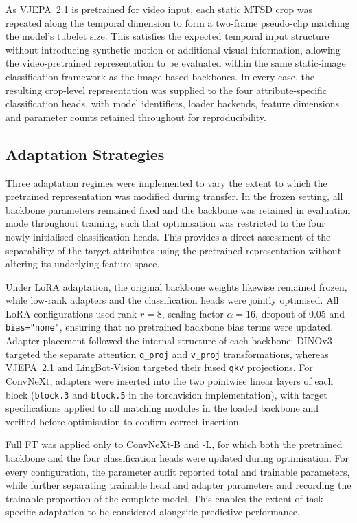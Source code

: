 As \gls{VJEPA}~2.1 is pretrained for video input, each static \gls{MTSD} crop was repeated along the temporal dimension to form a two-frame pseudo-clip matching the model's tubelet size. This satisfies the expected temporal input structure without introducing synthetic motion or additional visual information, allowing the video-pretrained representation to be evaluated within the same static-image classification framework as the image-based backbones. In every case, the resulting crop-level representation was supplied to the four attribute-specific classification heads, with model identifiers, loader backends, feature dimensions and parameter counts retained throughout for reproducibility.

\subsection{Adaptation Strategies}
\label{sec:attribute-adaptation}
Three adaptation regimes were implemented to vary the extent to which the pretrained representation was modified during transfer. In the frozen setting, all backbone parameters remained fixed and the backbone was retained in evaluation mode throughout training, such that optimisation was restricted to the four newly initialised classification heads. This provides a direct assessment of the separability of the target attributes using the pretrained representation without altering its underlying feature space.

Under \gls{LoRA} adaptation, the original backbone weights likewise remained frozen, while low-rank adapters and the classification heads were jointly optimised. All \gls{LoRA} configurations used rank \(r=8\), scaling factor \(\alpha=16\), dropout of 0.05 and \texttt{bias="none"}, ensuring that no pretrained backbone bias terms were updated. Adapter placement followed the internal structure of each backbone: \gls{DINO}v3 targeted the separate attention \texttt{q\_proj} and \texttt{v\_proj} transformations, whereas \gls{VJEPA}~2.1 and LingBot-Vision targeted their fused \texttt{qkv} projections. For ConvNeXt, adapters were inserted into the two pointwise linear layers of each block (\texttt{block.3} and \texttt{block.5} in the torchvision implementation), with target specifications applied to all matching modules in the loaded backbone and verified before optimisation to confirm correct insertion.

Full \gls{FT} was applied only to ConvNeXt-B and -L, for which both the pretrained backbone and the four classification heads were updated during optimisation. For every configuration, the parameter audit reported total and trainable parameters, while further separating trainable head and adapter parameters and recording the trainable proportion of the complete model. This enables the extent of task-specific adaptation to be considered alongside predictive performance.

